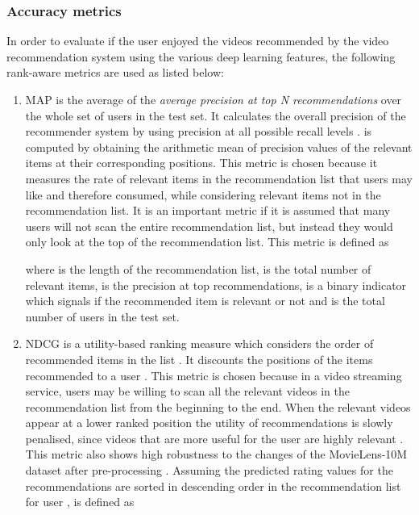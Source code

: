 \documentclass[review]{elsarticle}
\begin{document}
\subsubsection{Accuracy metrics}\label{sec:accuracy_metrics}
In order to evaluate if the user enjoyed the videos recommended by the video recommendation system using the various deep learning features, the following rank-aware metrics are used as listed below:\\

\begin{enumerate}
    
    \item \ac{MAP} is the average of the \textit{average precision at top N recommendations}  over the whole set of users in the test set. It calculates the overall precision of the recommender system by using precision at all possible recall levels \citep{deldjoo2019movie}.  is computed by obtaining the arithmetic mean of precision values of the relevant items at their corresponding positions. This metric is chosen because it measures the rate of relevant items in the recommendation list that users may like and therefore consumed, while considering relevant items not in the recommendation list. It is an important metric if it is assumed that many users will not scan the entire recommendation list, but instead they would only look at the top of the recommendation list. This metric is defined as \citep{deldjoo2019movie} 
    
    
    
    
    
    where  is the length of the recommendation list,  is the total number of relevant items,  is the precision at top  recommendations,  is a binary indicator which signals if the  recommended item is relevant or not and  is the total number of users in the test set.\\ 
    
    \item \ac{NDCG} is a utility-based ranking measure which considers the order of recommended items in the list \citep{lee2017large}. It discounts the positions of the items recommended to a user \citep{deldjoo2019movie}. This metric is chosen because in a video streaming service, users may be willing to scan all the relevant videos in the recommendation list from the beginning to the end. When the relevant videos appear at a lower ranked position the utility of recommendations is slowly penalised, since videos that are more useful for the user are highly relevant \citep{shani2011evaluating}. This metric also shows high robustness to the changes of the MovieLens-10M dataset after pre-processing \citep{tousch2019robust}. Assuming the predicted rating values for the recommendations are sorted in descending order in the recommendation list for user ,  is defined as \citep{deldjoo2019movie, matveeva2006high}
    

\end{enumerate}
\end{document}
